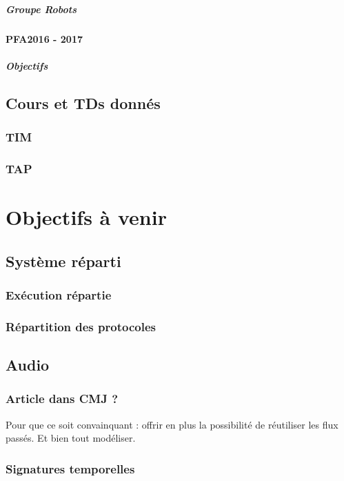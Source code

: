\documentclass[french,a4paper]{book}
\begin{document}
\paragraph{Groupe Robots}

\subsubsection{PFA2016 - 2017}
\paragraph{Objectifs}

\section{Cours et TDs donnés}
\subsection{TIM}
\subsection{TAP}

\chapter{Objectifs à venir}
\section{Système réparti}
\subsection{Exécution répartie}
\subsection{Répartition des protocoles}

\section{Audio}
\subsection{Article dans CMJ ?}
Pour que ce soit convainquant : offrir en plus la possibilité 
de réutiliser les flux passés. Et bien tout modéliser.

\subsection{Signatures temporelles}
\end{document}
